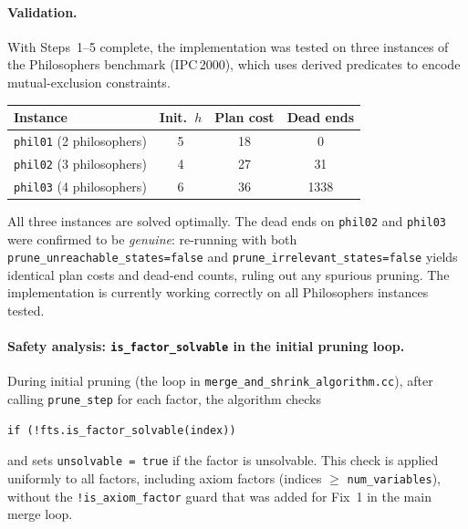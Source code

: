 \documentclass[11pt,a4paper]{article}
\begin{document}
\paragraph{Validation.}
With Steps~1--5 complete, the implementation was tested on three instances of
the Philosophers benchmark (IPC\,2000), which uses derived predicates to encode
mutual-exclusion constraints.

\begin{center}
\begin{tabular}{lccc}
\toprule
\textbf{Instance} & \textbf{Init.\ $h$} & \textbf{Plan cost} & \textbf{Dead ends} \\
\midrule
\texttt{phil01} (2 philosophers) & 5  & 18 & 0 \\
\texttt{phil02} (3 philosophers) & 4  & 27 & 31 \\
\texttt{phil03} (4 philosophers) & 6  & 36 & 1338 \\
\bottomrule
\end{tabular}
\end{center}

All three instances are solved optimally.  The dead ends on \texttt{phil02} and
\texttt{phil03} were confirmed to be \emph{genuine}: re-running with both
\texttt{prune\_unreachable\_states=false} and \texttt{prune\_irrelevant\_states=false}
yields identical plan costs and dead-end counts, ruling out any spurious
pruning.  The implementation is currently working correctly on all Philosophers
instances tested.

\paragraph{Safety analysis: \texttt{is\_factor\_solvable} in the initial pruning loop.}
During initial pruning (the loop in
\texttt{merge\_and\_shrink\_algorithm.cc}), after calling \texttt{prune\_step}
for each factor, the algorithm checks
\begin{verbatim}
if (!fts.is_factor_solvable(index))
\end{verbatim}
and sets \texttt{unsolvable = true} if the factor is unsolvable.  This check is
applied uniformly to all factors, including axiom factors (indices $\geq$
\texttt{num\_variables}), without the \texttt{!is\_axiom\_factor} guard that
was added for Fix~1 in the main merge loop.
\end{document}
